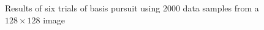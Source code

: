 \documentclass{IEEEtran}
\begin{document}
\begin{figure}[ht]
{  }%
  \qquad
  \caption{Results of six trials of basis pursuit using 2000 data samples from a $128\times128$ image}
\end{figure}



\end{document}
